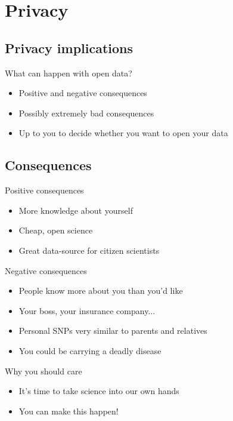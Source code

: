 \documentclass[12pt,a4paper]{beamer}
\begin{document}
\section{Privacy}
\subsection{Privacy implications}
\begin{frame}{What can happen with open data?}
\begin{itemize}
\item Positive and negative consequences
\pause \item Possibly extremely bad consequences
\pause \item Up to you to decide whether you want to open your data
\end{itemize}
\end{frame}

\subsection{Consequences}
\begin{frame}{Positive consequences}
\begin{itemize}
\item More knowledge about yourself
\pause \item Cheap, open science
\pause \item Great data-source for citizen scientists
\end{itemize}
\end{frame}

\begin{frame}{Negative consequences}
\begin{itemize}
\item People know more about you than you'd like
\pause \item Your boss, your insurance company...
\pause \item Personal SNPs very similar to parents and relatives
\pause \item You could be carrying a deadly disease
\end{itemize}
\end{frame}

\begin{frame}{Why you should care}
\begin{itemize}
\item It's time to take science into our own hands
\pause \item You can make this happen!
\end{itemize}
\end{frame}
\end{document}
